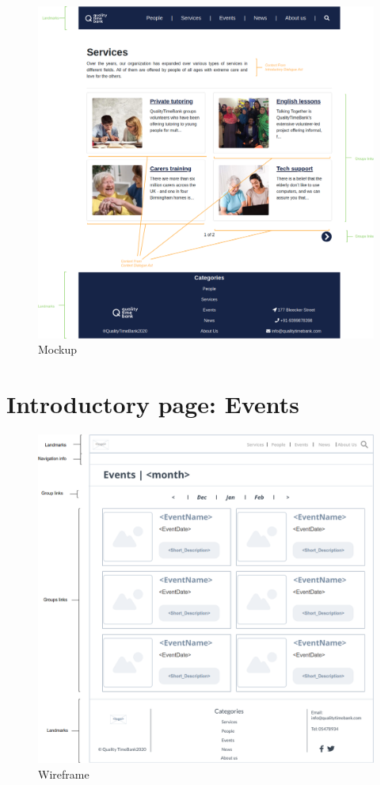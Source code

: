 \documentclass[a4paper, 11pt, parskip=half, headsepline]{scrreprt}
\begin{document}
\begin{figure}[H]
    \centering
    \includegraphics[width=1\linewidth, keepaspectratio]{mockups/ConcreteServices}
    \caption{Mockup}
\end{figure}

\section{Introductory page: Events}

\begin{figure}[H]
    \centering
    \includegraphics[width=1\linewidth, keepaspectratio]{wireframes/Introductory-Events}
    \caption{Wireframe}
\end{figure}
\end{document}
